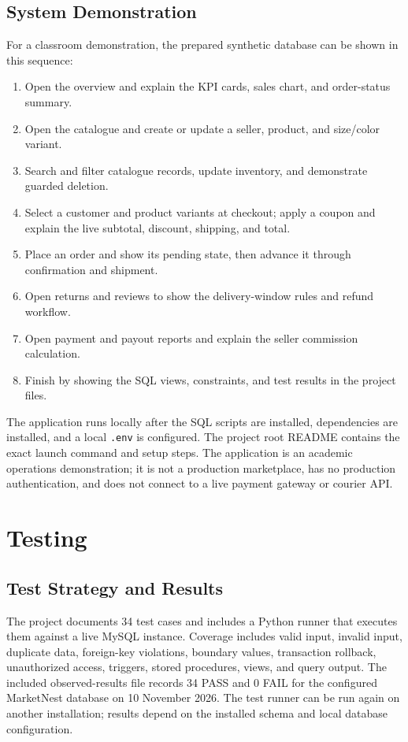 \documentclass[11pt,a4paper,oneside]{report}
\begin{document}
\section{System Demonstration}
For a classroom demonstration, the prepared synthetic database can be shown in this sequence:
\begin{enumerate}
 \item Open the overview and explain the KPI cards, sales chart, and order-status summary.
 \item Open the catalogue and create or update a seller, product, and size/color variant.
 \item Search and filter catalogue records, update inventory, and demonstrate guarded deletion.
 \item Select a customer and product variants at checkout; apply a coupon and explain the live subtotal, discount, shipping, and total.
 \item Place an order and show its pending state, then advance it through confirmation and shipment.
 \item Open returns and reviews to show the delivery-window rules and refund workflow.
 \item Open payment and payout reports and explain the seller commission calculation.
 \item Finish by showing the SQL views, constraints, and test results in the project files.
\end{enumerate}
The application runs locally after the SQL scripts are installed, dependencies are installed, and a local \texttt{.env} is configured. The project root README contains the exact launch command and setup steps. The application is an academic operations demonstration; it is not a production marketplace, has no production authentication, and does not connect to a live payment gateway or courier API.

\chapter{Testing}
\section{Test Strategy and Results}
The project documents 34 test cases and includes a Python runner that executes them against a live MySQL instance. Coverage includes valid input, invalid input, duplicate data, foreign-key violations, boundary values, transaction rollback, unauthorized access, triggers, stored procedures, views, and query output. The included observed-results file records 34 PASS and 0 FAIL for the configured MarketNest database on 10 November 2026. The test runner can be run again on another installation; results depend on the installed schema and local database configuration.
\end{document}
